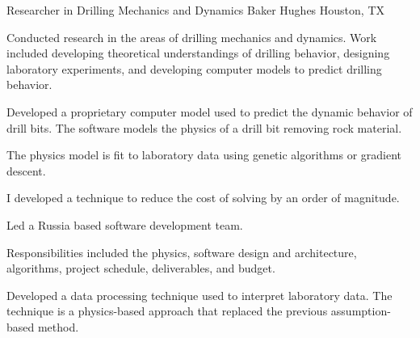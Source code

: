 \documentclass{leresume}
\begin{document}
            {Researcher in Drilling Mechanics and Dynamics}
            {Baker Hughes}
			{Houston, TX}
			
				Conducted research in the areas of drilling mechanics and dynamics.  Work included developing theoretical understandings of drilling behavior, designing laboratory experiments, and developing computer models to predict drilling behavior.
			
		\begin{bulletedlist}
			
		\item
		
					Developed a proprietary computer model used to predict the dynamic behavior of drill bits.  The software models the physics of a drill bit removing rock material.
					
		\begin{bulletedlist}
			
		\item
		
							The physics model is fit to laboratory data using genetic algorithms or gradient descent.  
						
		\item
		
							I developed a technique to reduce the cost of solving by an order of magnitude.
						
		\item
		Led a Russia based software development team.
		\item
		
							Responsibilities included the physics, software design and architecture, algorithms, project schedule, deliverables, and budget.
						
		\end{bulletedlist}
	
		\item
		Developed a data processing technique used to interpret laboratory data.  The technique is a physics-based approach that replaced the previous assumption-based method.
		\end{bulletedlist}
	

    
    
    
    
    
\end{document}
